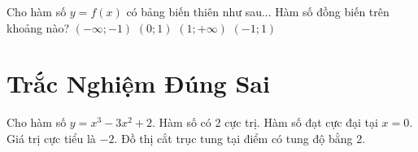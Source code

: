 \documentclass{article}
\begin{document}
\begin{ex}
    Cho hàm số $y=f(x)$ có bảng biến thiên như sau...
    Hàm số đồng biến trên khoảng nào?
    \choice
    {$(-\infty; -1)$}
    {$(0; 1)$}
    {\True $(1; +\infty)$}
    {$(-1; 1)$}
\end{ex}

\section{Trắc Nghiệm Đúng Sai}

\begin{ex}
    Cho hàm số $y=x^3 - 3x^2 + 2$.
    \choiceTF
    {Hàm số có 2 cực trị.}
    {\True Hàm số đạt cực đại tại $x=0$.}
    {Giá trị cực tiểu là $-2$.}
    {\True Đồ thị cắt trục tung tại điểm có tung độ bằng 2.}
\end{ex}

\StopProBook
\PrintAnswers
\end{document}
